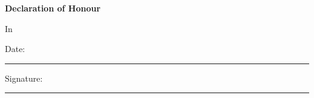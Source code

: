 \thispagestyle{empty} %

\vspace*{\fill}   

\noindent\LARGE\textbf{Declaration of Honour}\\

\normalsize

{
	\setlength{\parindent}{0pt}
	\declarationofhonor
}

\vspace{1.0cm}

\noindent In \citynamedeclarationofhonor

\vspace{1.0cm}

Date: \rule{5cm}{0.4pt} \hfill Signature: \rule{5cm}{0.4pt}

\newpage
